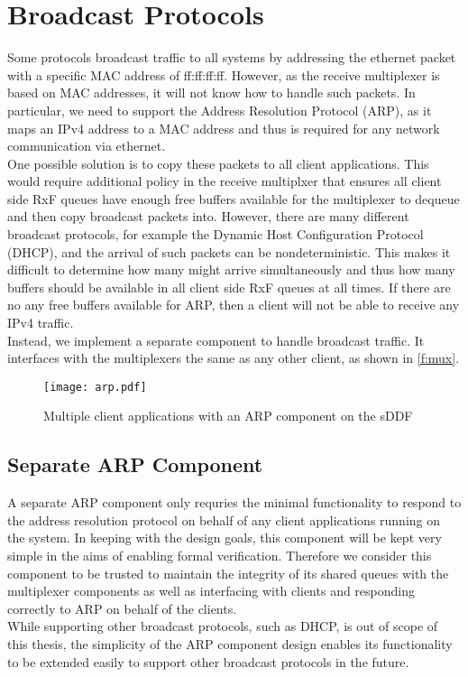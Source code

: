 \section{Broadcast Protocols}
Some protocols broadcast traffic to all systems by addressing the
ethernet packet with a specific MAC address of ff:ff:ff:ff. However,
as the receive multiplexer is based on MAC addresses, it will not
know how to handle such packets. In particular, we need to support 
the Address Resolution Protocol (ARP), as it maps an
IPv4 address to a MAC address and thus 
is required for any network communication via ethernet.\\
One possible solution is to copy these packets to all client applications.
This would require additional policy in the receive multiplxer that ensures
all client side RxF queues have enough free buffers available
for the multiplexer to dequeue and then copy broadcast packets into.
However, there are many different broadcast protocols, for example the Dynamic
Host Configuration Protocol (DHCP), and the arrival of such packets
can be nondeterministic. This makes it difficult to determine how many might arrive
simultaneously and thus how many buffers should be available in all client side
RxF queues at all times. If there are no any free buffers available for ARP, then
a client will not be able to receive any IPv4 traffic.\\
Instead, we implement a separate component to handle broadcast traffic. It interfaces
with the multiplexers the same as any other client, as shown in \autoref{f:mux}. 

\begin{figure}[h]
    \centering
    \texttt{[image: arp.pdf]}
    \caption{Multiple client applications with an ARP component on the sDDF}
    \label{f:arp}
\end{figure}

\subsection{Separate ARP Component}
A separate ARP component only requries the minimal functionality to respond to 
the address resolution protocol on behalf of any client applications running on
the system. In keeping with the design goals, this component will be kept 
very simple in the aims of enabling formal verification. Therefore we consider
this component to be trusted to maintain the integrity of its shared queues with
the multiplexer components as well as interfacing with clients and responding
correctly to ARP on behalf of the clients. \\
While supporting other broadcast protocols, such as DHCP, is out of scope of this thesis, 
the simplicity of the ARP component design enables its functionality to be extended easily
to support other broadcast protocols in the future.

